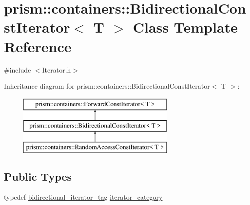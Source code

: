 \hypertarget{classprism_1_1containers_1_1_bidirectional_const_iterator}{}\section{prism\+:\+:containers\+:\+:Bidirectional\+Const\+Iterator$<$ T $>$ Class Template Reference}
\label{classprism_1_1containers_1_1_bidirectional_const_iterator}


{\ttfamily \#include $<$Iterator.\+h$>$}

Inheritance diagram for prism\+:\+:containers\+:\+:Bidirectional\+Const\+Iterator$<$ T $>$\+:\begin{figure}[H]
\begin{center}
\leavevmode
\includegraphics[height=3.000000cm]{classprism_1_1containers_1_1_bidirectional_const_iterator}
\end{center}
\end{figure}
\subsection*{Public Types}
\begin{DoxyCompactItemize}
\item 
typedef \hyperlink{structprism_1_1containers_1_1bidirectional__iterator__tag}{bidirectional\+\_\+iterator\+\_\+tag} \hyperlink{classprism_1_1containers_1_1_bidirectional_const_iterator_afeb6224f2cac9abafd79aff3e04a88c4}{iterator\+\_\+category}
\end{DoxyCompactItemize}
